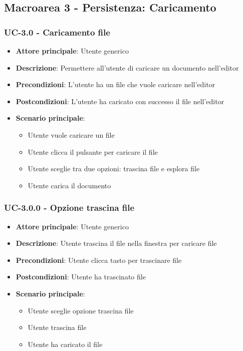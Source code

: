 \documentclass[11pt,a4paper]{article}
\begin{document}
\newpage

\subsection{Macroarea 3 - Persistenza: Caricamento}
\subsubsection{UC-3.0 - Caricamento file}
\begin{itemize}
    \item \textbf{Attore principale}: Utente generico
    \item \textbf{Descrizione}: Permettere all'utente di caricare un documento nell'editor
    \item \textbf{Precondizioni}: L'utente ha un file che vuole caricare nell'editor
    \item \textbf{Postcondizioni}: L'utente ha caricato con successo il file nell'editor
    \item \textbf{Scenario principale}:
        \begin{itemize}
            \item Utente vuole caricare un file
            \item Utente clicca il pulsante per caricare il file
            \item Utente sceglie tra due opzioni: trascina file e esplora file
            \item Utente carica il documento
        \end{itemize}
\end{itemize}

\subsubsection{UC-3.0.0 - Opzione trascina file}
\begin{itemize}
    \item \textbf{Attore principale}: Utente generico
    \item \textbf{Descrizione}: Utente trascina il file nella finestra per caricare file
    \item \textbf{Precondizioni}: Utente clicca tasto per trascinare file
    \item \textbf{Postcondizioni}: Utente ha trascinato file
    \item \textbf{Scenario principale}:
        \begin{itemize}
            \item Utente sceglie opzione trascina file
            \item Utente trascina file
            \item Utente ha caricato il file
        \end{itemize}
\end{itemize}
\end{document}
